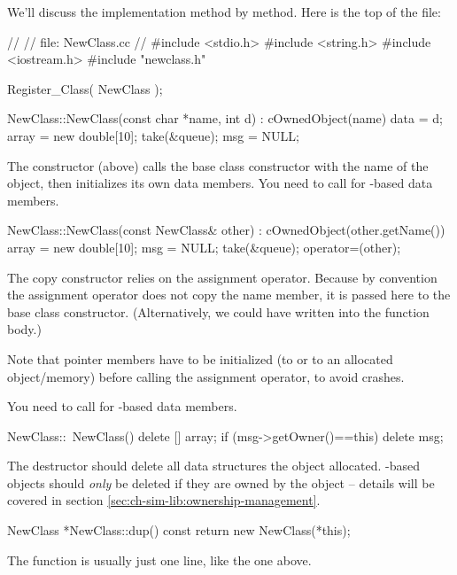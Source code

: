 We'll discuss the implementation method by method.
Here is the top of the  file:

\begin{cpp}
//
// file: NewClass.cc
//
#include <stdio.h>
#include <string.h>
#include <iostream.h>
#include "newclass.h"

Register_Class( NewClass );


NewClass::NewClass(const char *name, int d) : cOwnedObject(name)
{
    data = d;
    array = new double[10];
    take(&queue);
    msg = NULL;
}
\end{cpp}

The constructor (above) calls the base class constructor with
the name of the object, then initializes its own data members.
You need to call  for -based data members.


\begin{cpp}
NewClass::NewClass(const NewClass& other) : cOwnedObject(other.getName())
{
    array = new double[10];
    msg = NULL;
    take(&queue);
    operator=(other);
}
\end{cpp}

The copy constructor relies on the assignment operator. Because
by convention the assignment operator does not copy the
name member, it is passed here to the base class constructor.
(Alternatively, we could have written 
into the function body.)

Note that pointer members have to be initialized (to  or to an
allocated object/memory) before calling the assignment operator,
to avoid crashes.

You need to call  for -based data members.

\begin{cpp}
NewClass::~NewClass()
{
    delete [] array;
    if (msg->getOwner()==this)
        delete msg;
}
\end{cpp}

The destructor should delete all data structures the object allocated.
-based objects should \textit{only} be deleted if they
are owned by the object -- details will be covered in section
\ref{sec:ch-sim-lib:ownership-management}.

\begin{cpp}
NewClass *NewClass::dup() const
{
    return new NewClass(*this);
}
\end{cpp}

The  function  is usually just one line, like the one above.

